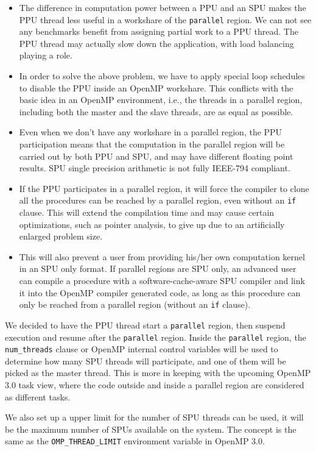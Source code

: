 \begin{itemize}

\item The difference in computation power between a PPU and an SPU makes
  the PPU thread less useful in a workshare of the \texttt{parallel}
  region. We can not see any benchmarks benefit from assigning partial
  work to a PPU thread. The PPU thread may actually slow down the application,
  with load balancing playing a role.

\item In order to solve the above problem, we have to apply special
  loop schedules to disable the PPU inside an OpenMP workshare. This
  conflicts with the basic idea in an OpenMP environment, i.e., the
  threads in a parallel region, including both the master and the slave
  threads, are as equal as possible.

\item Even when we don't have any workshare in a parallel region, the PPU
  participation means that the computation in the parallel region will
  be carried out by both PPU and SPU, and may have different
  floating point results. SPU single precision arithmetic is not
  fully IEEE-794 compliant.

\item If the PPU participates in a parallel region, it will force the compiler
  to clone all the procedures can be reached by a parallel region,
  even without an \texttt{if} clause. This will extend the compilation
  time and may cause certain optimizations, such as pointer analysis, to
  give up due to an artificially enlarged problem size.

\item This will also prevent a user from providing his/her own
  computation kernel in an SPU only format. If parallel regions are SPU
  only, an advanced user can compile a procedure with a
  software-cache-aware SPU compiler and link it into the OpenMP
  compiler generated code, as long as this procedure can only be reached from a
  parallel region (without an \texttt{if} clause).

\end{itemize}

We decided to have the PPU thread start a \texttt{parallel} region, then
suspend execution and resume after the \texttt{parallel} region. Inside the
\texttt{parallel} region, the \texttt{num\_threads} clause or OpenMP
internal control variables will be used to determine how many SPU threads will
participate, and one of them will be picked as the master thread. This is more
in keeping with the upcoming OpenMP 3.0 \cite{Ope08} task view, where the code
outside and inside a parallel region are considered as different tasks.

We also set up a upper limit for the number of SPU threads can be used, it will
be the maximum number of SPUs available on the system. The concept is the same
as the \texttt{OMP\_THREAD\_LIMIT} environment variable in OpenMP 3.0.


